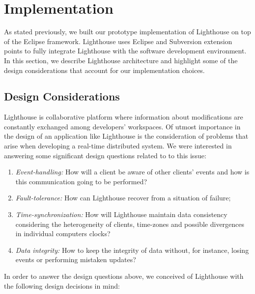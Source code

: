 \documentclass[10pt, conference, compsocconf]{IEEEtran}
\begin{document}
\section{Implementation}

As stated previously, we built our prototype implementation of Lighthouse on top of the Eclipse framework. Lighthouse uses Eclipse and Subversion extension points to fully integrate Lighthouse with the software development environment. In this section, we describe Lighthouse architecture and highlight some of the design considerations that account for our implementation choices.

\subsection{Design Considerations}

Lighthouse is collaborative platform where information about modifications are constantly exchanged among developers' workspaces. Of utmost importance in the design of an application like Lighthouse is the consideration of problems that arise when developing a real-time distributed system. We were interested in answering some significant design questions related to to this issue:

\begin{enumerate}
\item \textit{Event-handling:} How will a client be aware of other clients' events and how is this communication going to be performed?
\item \textit{Fault-tolerance:} How can Lighthouse recover from a situation of failure;
\item \textit{Time-synchronization:}  How will Lighthouse maintain data consistency considering the heterogeneity of clients, time-zones and possible divergences in individual computers clocks?
\item \textit{Data integrity:} How to keep the integrity of data without, for instance, losing events or performing mistaken updates? 
\end{enumerate} 

In order to answer the design questions above, we conceived of Lighthouse with the following design decisions in mind:
\end{document}
